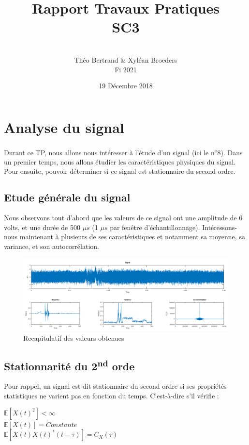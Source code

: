 \documentclass[french, a4paper, 12pt, openany]{book}
\title{\Huge{Rapport Travaux Pratiques \\ SC3}}
\author{\\ Théo Bertrand \& Xyléan Broeders \\ Fi 2021}
\date{19 Décembre 2018}
\begin{document}
\maketitle

\chapter{Analyse du signal}
	Durant ce TP, nous allons nous intéresser à l'étude d'un signal (ici le n\textsuperscript{o}8). Dans un premier temps, nous allons étudier les caractéristiques physiques du signal.  Pour ensuite, pouvoir déterminer si ce signal est stationnaire du second ordre.
\section{Etude générale du signal}
	Nous observons tout d'abord que les valeurs de ce signal ont une amplitude de 6 volts, et une durée de 500 $\mu s$ (1 $\mu s$ par fenêtre d'échantillonnage). Intéressons-nous maintenant à plusieurs de ses caractéristiques et notamment sa moyenne, sa variance, et son autocorrélation.
  \begin{figure}[ht]
    \begin{center}
    \includegraphics[scale=0.25]{images/SignalFull.png}
    \end{center}
    \caption{Recapitulatif des valeurs obtenues}
    \label{Recapitulatif des valeurs obtenues}
  \end{figure}

\section{Stationnarité du 2\textsuperscript{nd} orde}
	Pour rappel, un signal est dit stationnaire du second ordre si ses propriétés statistiques ne varient pas en fonction du temps. C'est-à-dire s'il vérifie :
  \begin{center}
  	\begin{math}\mathbb{E}[X(t)^2]<\infty\end{math} \\
  	\begin{math}\mathbb{E}[X(t)]=Constante\end{math} \\
  	\begin{math}\mathbb{E}[X(t)X(t)^*(t-\tau)]=C_X(\tau)\end{math}
  \end{center}
	\newpage
\end{document}
